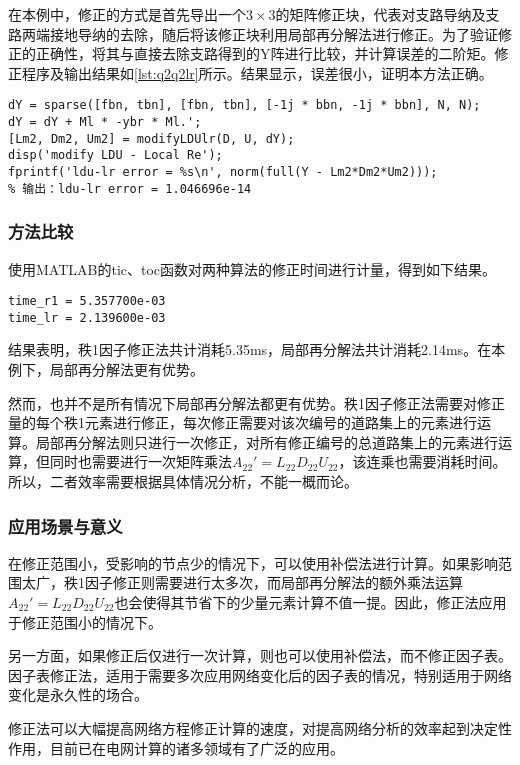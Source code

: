 \documentclass[a4paper,12pt]{article}
\begin{document}
    在本例中，修正的方式是首先导出一个$3\times 3$的矩阵修正块，代表对支路导纳及支路两端接地导纳的去除，随后将该修正块利用局部再分解法进行修正。为了验证修正的正确性，将其与直接去除支路得到的Y阵进行比较，并计算误差的二阶矩。修正程序及输出结果如\cref{lst:q2q2lr}所示。结果显示，误差很小，证明本方法正确。
    \begin{lstlisting}[style=Matlab-editor,basicstyle=\mlttfamily,label=lst:q2q2lr,caption={秩1因子修正法去除支路}]
%% Modify LDU - Local Re
dY = sparse([fbn, tbn], [fbn, tbn], [-1j * bbn, -1j * bbn], N, N);
dY = dY + Ml * -ybr * Ml.';
[Lm2, Dm2, Um2] = modifyLDUlr(D, U, dY);
disp('modify LDU - Local Re');
fprintf('ldu-lr error = %s\n', norm(full(Y - Lm2*Dm2*Um2)));
% 输出：ldu-lr error = 1.046696e-14
    \end{lstlisting}
    \subsubsection{方法比较}
    使用MATLAB的tic、toc函数对两种算法的修正时间进行计量，得到如下结果。
    \begin{lstlisting}
time_r1 = 5.357700e-03
time_lr = 2.139600e-03
    \end{lstlisting}

    结果表明，秩1因子修正法共计消耗5.35ms，局部再分解法共计消耗2.14ms。在本例下，局部再分解法更有优势。

    然而，也并不是所有情况下局部再分解法都更有优势。秩1因子修正法需要对修正量的每个秩1元素进行修正，每次修正需要对该次编号的道路集上的元素进行运算。局部再分解法则只进行一次修正，对所有修正编号的总道路集上的元素进行运算，但同时也需要进行一次矩阵乘法$A_{22}'=L_{22}D_{22}U_{22}$，该连乘也需要消耗时间。所以，二者效率需要根据具体情况分析，不能一概而论。
    \subsubsection{应用场景与意义}
    在修正范围小，受影响的节点少的情况下，可以使用补偿法进行计算。如果影响范围太广，秩1因子修正则需要进行太多次，而局部再分解法的额外乘法运算$A_{22}'=L_{22}D_{22}U_{22}$也会使得其节省下的少量元素计算不值一提。因此，修正法应用于修正范围小的情况下。

    另一方面，如果修正后仅进行一次计算，则也可以使用补偿法，而不修正因子表。因子表修正法，适用于需要多次应用网络变化后的因子表的情况，特别适用于网络变化是永久性的场合。

    修正法可以大幅提高网络方程修正计算的速度，对提高网络分析的效率起到决定性作用，目前已在电网计算的诸多领域有了广泛的应用\cite{教材}。
\end{document}
